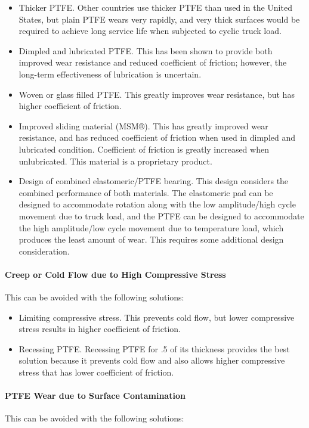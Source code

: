 \begin{itemize}
  \item Thicker PTFE. Other countries use thicker PTFE than used in the United States, but plain PTFE wears very
  rapidly, and very thick surfaces would be required to achieve long service life when subjected to cyclic truck
  load.
  \item Dimpled and lubricated PTFE. This has been shown to provide both improved wear resistance and reduced
  coefficient of friction; however, the long-term effectiveness of lubrication is uncertain.
  \item Woven or glass filled PTFE. This greatly improves wear resistance, but has higher coefficient of friction.
  \item Improved sliding material (MSM®). This has greatly improved wear resistance, and has reduced coefficient
  of friction when used in dimpled and lubricated condition. Coefficient of friction is greatly increased when
  unlubricated. This material is a proprietary product.
  \item Design of combined elastomeric/PTFE bearing. This design considers the combined performance of both
  materials. The elastomeric pad can be designed to accommodate rotation along with the low amplitude/high
  cycle movement due to truck load, and the PTFE can be designed to accommodate the high amplitude/low
  cycle movement due to temperature load, which produces the least amount of wear. This requires some
  additional design consideration.
\end{itemize}

\paragraph{Creep or Cold Flow due to High Compressive Stress}
This can be avoided with the following solutions:
\begin{itemize}
  \item Limiting compressive stress. This prevents cold flow, but lower compressive stress results in higher
  coefficient of friction.
  \item Recessing PTFE. Recessing PTFE for .5 of its thickness provides the best solution because it prevents cold
  flow and also allows higher compressive stress that has lower coefficient of friction.
\end{itemize}

\paragraph{PTFE Wear due to Surface Contamination}
This can be avoided with the following solutions:

